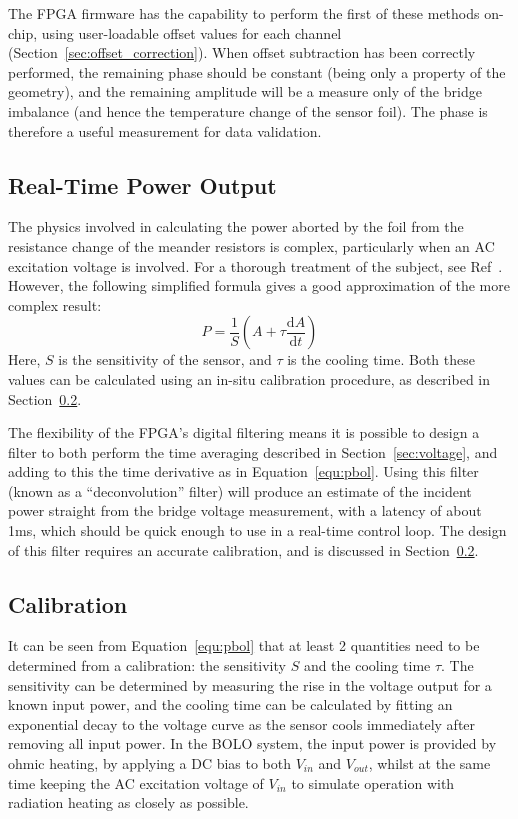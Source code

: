 \documentclass[12pt,a4paper]{article}
\begin{document}
The FPGA firmware has the capability to perform the first of these methods on-chip, using user-loadable offset values for each channel
(Section~\ref{sec:offset_correction}). When offset subtraction has been correctly performed, the remaining phase should be constant (being only a property
of the geometry), and the remaining amplitude will be a measure only of the bridge imbalance (and hence the temperature change of the sensor foil). The
phase is therefore a useful measurement for data validation.

\subsection{Real-Time Power Output}
\label{sec:rtpower}
The physics involved in calculating the power aborted by the foil from the resistance change of the meander resistors is complex, particularly when an AC
excitation voltage is involved. For a thorough treatment of the subject, see Ref~\cite{giannone-2002}. However, the following simplified formula gives a
good approximation of the more complex result:
\begin{equation}
  \label{equ:pbol}
  P = \frac{1}{S}\left(A + \tau \frac{\mathrm{d}A}{\mathrm{d}t}\right)
\end{equation}
Here, $S$ is the sensitivity of the sensor, and $\tau$ is the cooling time. Both these values can be calculated using an in-situ calibration procedure, as
described in Section~\ref{sec:calibration}.

The flexibility of the FPGA's digital filtering means it is possible to design a filter to both perform the time averaging described in
Section~\ref{sec:voltage}, and adding to this the time derivative as in Equation~\ref{equ:pbol}. Using this filter (known as a ``deconvolution'' filter)
will produce an estimate of the incident power straight from the bridge voltage measurement, with a latency of about 1ms, which should be quick enough to
use in a real-time control loop. The design of this filter requires an accurate calibration, and is discussed in Section~\ref{sec:calibration}.

\subsection{Calibration}
\label{sec:calibration}
It can be seen from Equation~\ref{equ:pbol} that at least 2 quantities need to be determined from a calibration: the sensitivity $S$ and the cooling time
$\tau$. The sensitivity can be determined by measuring the rise in the voltage output for a known input power, and the cooling time can be calculated by
fitting an exponential decay to the voltage curve as the sensor cools immediately after removing all input power. In the BOLO system, the input power is
provided by ohmic heating, by applying a DC bias to both $V_{in}$ and $V_{out}$, whilst at the same time keeping the AC excitation voltage of $V_{in}$ to
simulate operation with radiation heating as closely as possible.
\end{document}
